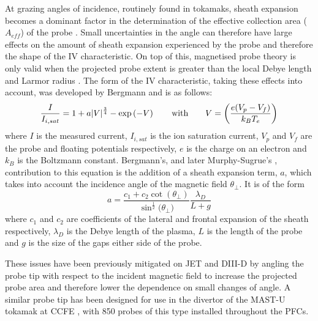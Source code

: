 \documentclass[a4paper, 12pt]{article} %
\begin{document}
	At grazing angles of incidence, routinely found in tokamaks, sheath expansion becomes a dominant factor in the determination of the effective collection area ($A_{eff}$) of the probe \cite{Bergmann1994}. 
	Small uncertainties in the angle can therefore have large effects on the amount of sheath expansion experienced by the probe and therefore the shape of the IV characteristic.
	On top of this, magnetised probe theory is only valid when the projected probe extent is greater than the local Debye length and Larmor radius \cite{Gunn1995}. 
	The form of the IV characteristic, taking these effects into account, was developed by Bergmann \cite{Bergmann2002} and is as follows:
	\begin{equation}
	\label{eq:ivcurvesheathexp}
	\frac{I}{I_{i,sat}} =  1 + a |V|^{\frac{3}{4}} - \exp\left({-V}\right) \qquad \textnormal{with} \qquad  V = \bigg(\frac{e(V_p - V_f)}{k_B T_e}\bigg)
	\end{equation}
	where $I$ is the measured current, $I_{i,sat}$ is the ion saturation current, $V_p$ and $V_f$ are the probe and floating potentials respectively, $e$ is the charge on an electron and $k_B$ is the Boltzmann constant. 
	Bergmann's, and later Murphy-Sugrue's \cite{Murphy-Sugrue2017}, contribution to this equation is the addition of a sheath expansion term, $a$, which takes into account the incidence angle of the magnetic field $\theta_{\perp}$. 
	It is of the form
	\begin{equation}
	\label{eq:sheathexpparam}
	a =  \frac{c_1 + c_2  \cot{(\theta_{\perp})}}{\sin^{\frac{1}{2}}{(\theta_{\perp}})} \frac{\lambda_D}{L + g}
	\end{equation}
	where $c_1$ and $c_2$ are coefficients of the lateral and frontal expansion of the sheath respectively, $\lambda_D$ is the Debye length of the plasma, $L$ is the length of the probe and $g$ is the size of the gaps either side of the probe.
	
	These issues have been previously mitigated on JET\cite{Monk1996} and DIII-D by angling the probe tip with respect to the incident magnetic field to increase the projected probe area and therefore lower the dependence on small changes of angle. 
	A similar probe tip has been designed for use in the divertor of the MAST-U tokamak at CCFE \cite{Harrison}, with 850 probes of this type installed throughout the PFCs.
	
\end{document}
